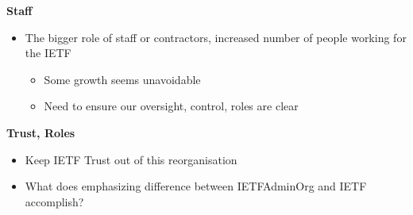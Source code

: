 \documentclass[helvetica,a4paper,landscape]{seminar}
\newcommand{\heading}[1]{%
  \begin{center} 
    \large\bf 
    #1 
  \end{center} 
  \vspace{.4 in}}
\begin{document}
\begin{slide}
\heading{Staff}
\begin{itemize}
\item The bigger role of staff or contractors, increased number of people working for the IETF
  \begin{itemize}
  \item Some growth seems unavoidable
  \item Need to ensure our oversight, control, roles are clear
  \end{itemize}
\end{itemize}
\end{slide}

\begin{slide}
\heading{Trust, Roles}
\begin{itemize}
\item Keep IETF Trust out of this reorganisation
\item What does emphasizing difference between IETFAdminOrg and IETF accomplish?
\end{itemize}
\end{slide}
\end{document}
